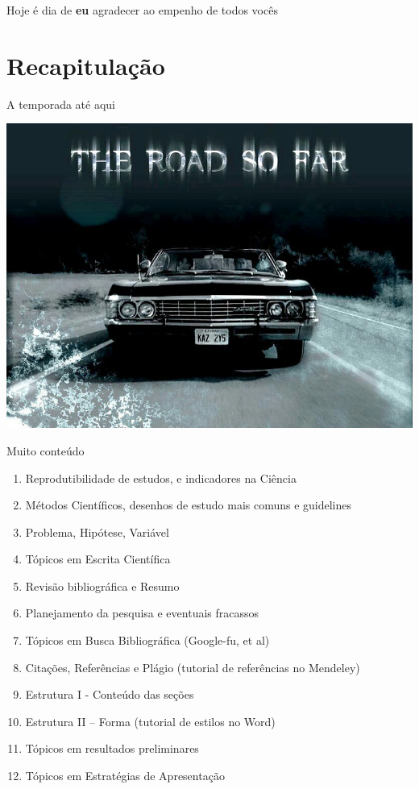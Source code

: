 \documentclass{beamer}
\begin{document}
\begin{frame}
  \begin{center}
    Hoje é dia de {\bf eu} agradecer ao empenho de todos vocês
  \end{center}
\end{frame}

\section{Recapitulação}

\begin{frame}{A temporada até aqui}
  \begin{center}
    \includegraphics[width=\textwidth]{Encerramento/theroadsofar}
  \end{center}
\end{frame}

\begin{frame}{Muito conteúdo}
  \begin{enumerate}
    \scriptsize
  \item Reprodutibilidade de estudos, e indicadores na Ciência
  \item Métodos Científicos, desenhos de estudo mais comuns e guidelines
  \item Problema, Hipótese, Variável
  \item Tópicos em Escrita Científica
  \item Revisão bibliográfica e Resumo
  \item Planejamento da pesquisa e eventuais fracassos
  \item Tópicos em Busca Bibliográfica (Google-fu, et al)
  \item Citações, Referências e Plágio (tutorial de referências no Mendeley)
  \item Estrutura I - Conteúdo das seções
  \item Estrutura II – Forma (tutorial de estilos no Word)
  \item Tópicos em resultados preliminares
  \item Tópicos em Estratégias de Apresentação
  \end{enumerate}
\end{frame}
\end{document}
